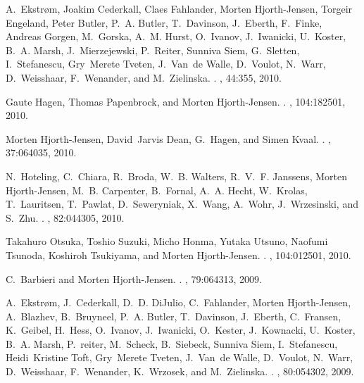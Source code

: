 \begin{thebibliography}{200}
A.~Ekstr\o{}m, Joakim Cederkall, Claes Fahlander, Morten Hjorth-Jensen, Torgeir
  Engeland, Peter Butler, P.~A. Butler, T.~Davinson, J.~Eberth, F.~Finke,
  Andreas Gorgen, M.~Gorska, A.~M. Hurst, O.~Ivanov, J.~Iwanicki, U.~Koster,
  B.~A. Marsh, J.~Mierzejewski, P.~Reiter, Sunniva Siem, G.~Sletten,
  I.~Stefanescu, Gry~Merete Tveten, J.~Van~de Walle, D.~Voulot, N.~Warr,
  D.~Weisshaar, F.~Wenander, and M.~Zielinska.
.
, 44:355, 2010.

Gaute Hagen, Thomas Papenbrock, and Morten Hjorth-Jensen.
.
, 104:182501, 2010.

Morten Hjorth-Jensen, David~Jarvis Dean, G.~Hagen, and Simen Kvaal.
.
, 37:064035,
  2010.

N.~Hoteling, C.~Chiara, R.~Broda, W.~B. Walters, R.~V.~F. Janssens, Morten
  Hjorth-Jensen, M.~B. Carpenter, B.~Fornal, A.~A. Hecht, W.~Krolas,
  T.~Lauritsen, T.~Pawlat, D.~Seweryniak, X.~Wang, A.~Wohr, J.~Wrzesinski, and
  S.~Zhu.
.
, 82:044305, 2010.

Takahuro Otsuka, Toshio Suzuki, Micho Honma, Yutaka Utsuno, Naofumi Tsunoda,
  Koshiroh Tsukiyama, and Morten Hjorth-Jensen.
.
, 104:012501, 2010.

C.~Barbieri and Morten Hjorth-Jensen.
.
, 79:064313, 2009.

A.~Ekstr\o{}m, J.~Cederkall, D.~D. DiJulio, C.~Fahlander, Morten Hjorth-Jensen,
  A.~Blazhev, B.~Bruyneel, P.~A. Butler, T.~Davinson, J.~Eberth, C.~Fransen,
  K.~Geibel, H.~Hess, O.~Ivanov, J.~Iwanicki, O.~Kester, J.~Kownacki,
  U.~Koster, B.~A. Marsh, P.~reiter, M.~Scheck, B.~Siebeck, Sunniva Siem,
  I.~Stefanescu, Heidi~Kristine Toft, Gry~Merete Tveten, J.~Van~de Walle,
  D.~Voulot, N.~Warr, D.~Weisshaar, F.~Wenander, K.~Wrzosek, and M.~Zielinska.
.
, 80:054302, 2009.


\end{thebibliography}
